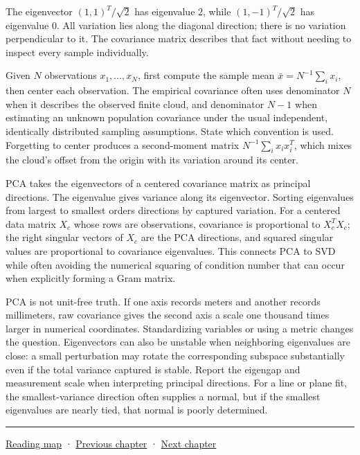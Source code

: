 The eigenvector \((1,1)^T/\sqrt2\) has eigenvalue \(2\), while \((1,-1)^T/\sqrt2\) has eigenvalue \(0\). All variation lies along the diagonal direction; there is no variation perpendicular to it. The covariance matrix describes that fact without needing to inspect every sample individually.

Given \(N\) observations \(x_1,\ldots,x_N\), first compute the sample mean \(\bar x=N^{-1}\sum_i x_i\), then center each observation. The empirical covariance often uses denominator \(N\) when it describes the observed finite cloud, and denominator \(N-1\) when estimating an unknown population covariance under the usual independent, identically distributed sampling assumptions. State which convention is used. Forgetting to center produces a second-moment matrix \(N^{-1}\sum_i x_ix_i^T\), which mixes the cloud's offset from the origin with its variation around its center.

PCA takes the eigenvectors of a centered covariance matrix as principal directions. The eigenvalue gives variance along its eigenvector. Sorting eigenvalues from largest to smallest orders directions by captured variation. For a centered data matrix \(X_c\) whose rows are observations, covariance is proportional to \(X_c^TX_c\); the right singular vectors of \(X_c\) are the PCA directions, and squared singular values are proportional to covariance eigenvalues. This connects PCA to SVD while often avoiding the numerical squaring of condition number that can occur when explicitly forming a Gram matrix.

PCA is not unit-free truth. If one axis records meters and another records millimeters, raw covariance gives the second axis a scale one thousand times larger in numerical coordinates. Standardizing variables or using a metric changes the question. Eigenvectors can also be unstable when neighboring eigenvalues are close: a small perturbation may rotate the corresponding subspace substantially even if the total variance captured is stable. Report the eigengap and measurement scale when interpreting principal directions. For a line or plane fit, the smallest-variance direction often supplies a normal, but if the smallest eigenvalues are nearly tied, that normal is poorly determined.

\begin{center}\rule{0.5\linewidth}{0.5pt}\end{center}

\hyperref[volume-reading-map]{Reading map} · \hyperref[02-foundations-ii-ch021-multivariable-derivatives-and-sensitivity]{Previous chapter} · \hyperref[02-foundations-ii-ch023-probability-models-and-measurement-error]{Next chapter}
